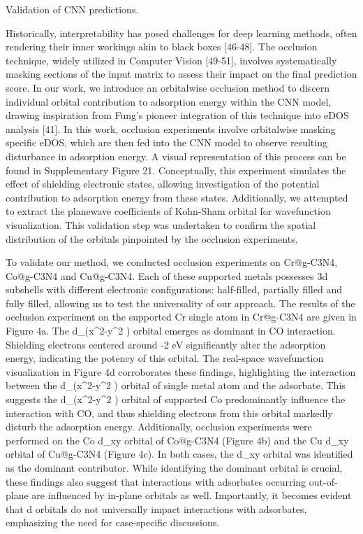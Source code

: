 Validation of CNN predictions.

Historically, interpretability has posed challenges for deep learning methods, often rendering their inner workings akin to black boxes [46-48]. The occlusion technique, widely utilized in Computer Vision [49-51], involves systematically masking sections of the input matrix to assess their impact on the final prediction score. In our work, we introduce an orbitalwise occlusion method to discern individual orbital contribution to adsorption energy within the CNN model, drawing inspiration from Fung's pioneer integration of this technique into eDOS analysis [41]. In this work, occlusion experiments involve orbitalwise masking specific eDOS, which are then fed into the CNN model to observe resulting disturbance in adsorption energy. A visual representation of this process can be found in Supplementary Figure 21. Conceptually, this experiment simulates the effect of shielding electronic states, allowing investigation of the potential contribution to adsorption energy from these states. Additionally, we attempted to extract the planewave coefficients of Kohn-Sham orbital for wavefunction visualization. This validation step was undertaken to confirm the spatial distribution of the orbitals pinpointed by the occlusion experiments.

To validate our method, we conducted occlusion experiments on Cr@g-C3N4, Co@g-C3N4 and Cu@g-C3N4. Each of these supported metals possesses 3d subshells with different electronic configurations: half-filled, partially filled and fully filled, allowing us to test the universality of our approach. The results of the occlusion experiment on the supported Cr single atom in Cr@g-C3N4 are given in Figure 4a. The d_(x^2-y^2 ) orbital emerges as dominant in CO interaction. Shielding electrons centered around -2 eV significantly alter the adsorption energy, indicating the potency of this orbital. The real-space wavefunction visualization in Figure 4d corroborates these findings, highlighting the interaction between the d_(x^2-y^2 ) orbital of single metal atom and the adsorbate. This suggests the d_(x^2-y^2 ) orbital of supported Co predominantly influence the interaction with CO, and thus shielding electrons from this orbital markedly disturb the adsorption energy. Additionally, occlusion experiments were performed on the Co d_xy orbital of Co@g-C3N4 (Figure 4b) and the Cu d_xy orbital of Cu@g-C3N4 (Figure 4c). In both cases, the d_xy orbital was identified as the dominant contributor. While identifying the dominant orbital is crucial, these findings also suggest that interactions with adsorbates occurring out-of-plane are influenced by in-plane orbitals as well. Importantly, it becomes evident that d orbitals do not universally impact interactions with adsorbates, emphasizing the need for case-specific discussions.

